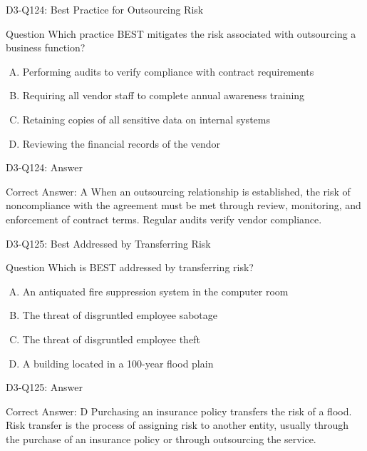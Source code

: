 \documentclass{beamer}
\begin{document}
	\begin{frame}{D3-Q124: Best Practice for Outsourcing Risk}
		\begin{block}{Question}
			Which practice BEST mitigates the risk associated with outsourcing a business function?
		\end{block}
		\begin{enumerate}[(A)]
			\item Performing audits to verify compliance with contract requirements
			\item Requiring all vendor staff to complete annual awareness training
			\item Retaining copies of all sensitive data on internal systems
			\item Reviewing the financial records of the vendor
		\end{enumerate}
	\end{frame}
	\begin{frame}{D3-Q124: Answer}
		\begin{block}{Correct Answer: A}
			When an outsourcing relationship is established, the risk of noncompliance with the agreement must be met through review, monitoring, and enforcement of contract terms. Regular audits verify vendor compliance.
		\end{block}
	\end{frame}
	
	\begin{frame}{D3-Q125: Best Addressed by Transferring Risk}
		\begin{block}{Question}
			Which is BEST addressed by transferring risk?
		\end{block}
		\begin{enumerate}[(A)]
			\item An antiquated fire suppression system in the computer room
			\item The threat of disgruntled employee sabotage
			\item The threat of disgruntled employee theft
			\item A building located in a 100-year flood plain
		\end{enumerate}
	\end{frame}
	\begin{frame}{D3-Q125: Answer}
		\begin{block}{Correct Answer: D}
			Purchasing an insurance policy transfers the risk of a flood. Risk transfer is the process of assigning risk to another entity, usually through the purchase of an insurance policy or through outsourcing the service.
		\end{block}
	\end{frame}
	
\end{document}

